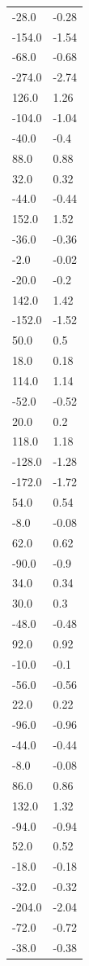 \begin{longtable}{ll}
-28.0 & -0.28 \\
-154.0 & -1.54 \\
-68.0 & -0.68 \\
-274.0 & -2.74 \\
126.0 & 1.26 \\
-104.0 & -1.04 \\
-40.0 & -0.4 \\
88.0 & 0.88 \\
32.0 & 0.32 \\
-44.0 & -0.44 \\
152.0 & 1.52 \\
-36.0 & -0.36 \\
-2.0 & -0.02 \\
-20.0 & -0.2 \\
142.0 & 1.42 \\
-152.0 & -1.52 \\
50.0 & 0.5 \\
18.0 & 0.18 \\
114.0 & 1.14 \\
-52.0 & -0.52 \\
20.0 & 0.2 \\
118.0 & 1.18 \\
-128.0 & -1.28 \\
-172.0 & -1.72 \\
54.0 & 0.54 \\
-8.0 & -0.08 \\
62.0 & 0.62 \\
-90.0 & -0.9 \\
34.0 & 0.34 \\
30.0 & 0.3 \\
-48.0 & -0.48 \\
92.0 & 0.92 \\
-10.0 & -0.1 \\
-56.0 & -0.56 \\
22.0 & 0.22 \\
-96.0 & -0.96 \\
-44.0 & -0.44 \\
-8.0 & -0.08 \\
86.0 & 0.86 \\
132.0 & 1.32 \\
-94.0 & -0.94 \\
52.0 & 0.52 \\
-18.0 & -0.18 \\
-32.0 & -0.32 \\
-204.0 & -2.04 \\
-72.0 & -0.72 \\
-38.0 & -0.38 \\

\end{longtable}
